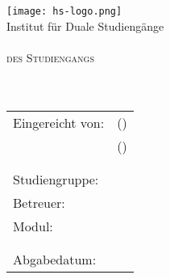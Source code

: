 
\begin{titlepage}

	\begin{center}
		\texttt{[image: hs-logo.png]}\\
		\large{Institut für Duale Studiengänge}\\[4ex]
		
		\large{\scshape \betreff}\\
		\large{\scshape des Studiengangs \studiengang}\\[20ex]
		
		
		\huge{\textbf{\titel}}\\[1.5ex]
		\Large{\textbf{\untertitel}}\\[20ex]
	\end{center}
	
	\begin{tabular} { p{7.5cm} l }
		Eingereicht von: 
		& \autorName (\autorMatrikel) \\
		& \autorZweiName (\autorZweiMatrikel) \\
		\\
		\\
		Studiengruppe: & \autorStudiengruppe \\
		Betreuer: & \betreuer \\
		Modul: & \modul \\
		\\\\
		Abgabedatum: & \abgabeTermin \\
	\end{tabular}


\end{titlepage}
